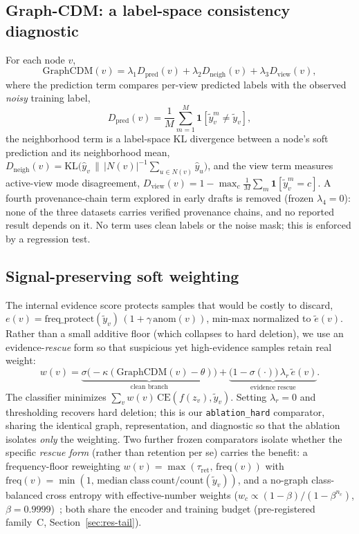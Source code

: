 \documentclass[pdflatex,referee,lineno,sn-basic,Numbered]{sn-jnl}
\begin{document}
\subsection{Graph-CDM: a label-space consistency diagnostic}
For each node $v$,
\begin{equation}
\mathrm{GraphCDM}(v)=\lambda_1 D_{\text{pred}}(v)+\lambda_2 D_{\text{neigh}}(v)
+\lambda_3 D_{\text{view}}(v),
\end{equation}
where the prediction term compares per-view predicted labels with the observed
\emph{noisy} training label,
\begin{equation}
D_{\text{pred}}(v)=\frac{1}{M}\sum_{m=1}^{M}\mathbf{1}[\tilde{y}^{m}_v\neq \tilde{y}_v],
\end{equation}
the neighborhood term is a label-space KL divergence between a node's soft
prediction and its neighborhood mean,
$D_{\text{neigh}}(v)=\mathrm{KL}\!\big(\hat{y}_v \,\|\,
|N(v)|^{-1}\sum_{u\in N(v)}\hat{y}_u\big)$,
and the view term measures active-view mode disagreement,
$D_{\text{view}}(v)=1-\max_c\frac1M\sum_m\mathbf{1}[\tilde{y}^{m}_v=c]$.
A fourth provenance-chain term explored in early drafts is removed (frozen
$\lambda_4{=}0$): none of the three datasets carries verified provenance chains,
and no reported result depends on it. No term uses clean labels or the noise
mask; this is enforced by a regression test.

\subsection{Signal-preserving soft weighting}
The internal evidence score protects samples that would be costly to discard,
$e(v)=\text{freq\_protect}(\tilde{y}_v)\,(1+\gamma\,\text{anom}(v))$, min-max
normalized to $\tilde{e}(v)$. Rather than a small additive floor (which collapses
to hard deletion), we use an evidence-\emph{rescue} form so that suspicious yet
high-evidence samples retain real weight:
\begin{equation}
w(v)=\underbrace{\sigma\!\big(-\kappa(\mathrm{GraphCDM}(v)-\theta)\big)}_{\text{clean branch}}
+\underbrace{\big(1-\sigma(\cdot)\big)\,\lambda_{r}\,\tilde{e}(v)}_{\text{evidence rescue}} .
\end{equation}
The classifier minimizes $\sum_v w(v)\,\mathrm{CE}(f(z_v),\tilde{y}_v)$. Setting
$\lambda_r=0$ and thresholding recovers hard deletion; this is our
\texttt{ablation\_hard} comparator, sharing the identical graph, representation,
and diagnostic so that the ablation isolates \emph{only} the weighting.
Two further frozen comparators isolate whether the specific \emph{rescue form}
(rather than retention per se) carries the benefit: a frequency-floor
reweighting $w(v)=\max(\tau_{\text{ret}},\,\mathrm{freq}(v))$ with
$\mathrm{freq}(v)=\min(1,\,\mathrm{median\ class\ count}/\mathrm{count}(\tilde{y}_v))$,
and a no-graph class-balanced cross entropy with effective-number weights
($w_c\propto(1-\beta)/(1-\beta^{n_c})$, $\beta{=}0.9999$)~\cite{cui2019classbalanced};
both share the encoder and training budget (pre-registered family~C,
Section~\ref{sec:res-tail}).
\end{document}
